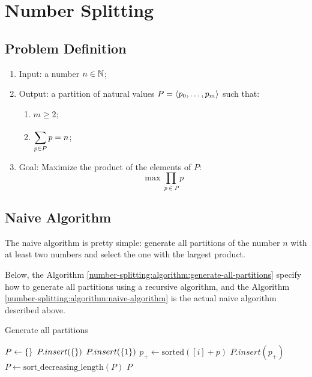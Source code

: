 \chapter{Number Splitting}

\newcommand{\Product}[2]{\prod\limits_{#1} #2}
\newcommand{\Floor}[1]{\left\lfloor #1 \right\rfloor}

\section{Problem Definition}

\begin{enumerate}
    \item Input: a number $n \in \mathbb{N}$;
    \item Output: a partition of natural values $P = \left\langle p_{0}, \dots, p_{m} \right\rangle$ such that:
    \begin{enumerate}
        \item $m \geqslant 2$;
        \item $\displaystyle\sum\limits_{p \in P}^{} p = n$;
    \end{enumerate}
    \item Goal: Maximize the product of the elements of $P$:
    \begin{equation}
        \max \Product{p \in P}{p}
    \end{equation}
\end{enumerate}

\section{Naive Algorithm}

The naive algorithm is pretty simple: generate all partitions of the number $n$ with at least two numbers and select the one with the largest product.

Below, the Algorithm \ref{number-splitting:algorithm:generate-all-partitions} specify how to generate all partitions using a recursive algorithm, and the Algorithm \ref{number-splitting:algorithm:naive-algorithm} is the actual naive algorithm described above.

\begin{algorithm}[H]
    \caption{Generate all partitions}
    \label{number-splitting:algorithm:generate-all-partitions}
    \begin{algorithmic}[1]
            \State $P \gets \left\{  \right\}$
                \State $P.insert(\left\{  \right\})$
                \State $P.insert(\left\{ 1 \right\})$
            \EndIf
                    \State $p_+ \gets \text{sorted}([i] + p)$
                    \State $P.insert(p_+)$
                \EndFor
            \EndFor
            \State $P \gets \text{sort\_decreasing\_length}(P)$
            \State \Return $P$
        \EndFunction
        \end{algorithmic}
\end{algorithm}

